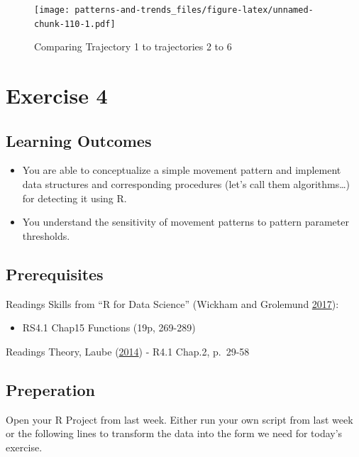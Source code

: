 \documentclass[]{book}
\providecommand{\tightlist}{%
  \setlength{\itemsep}{0pt}\setlength{\parskip}{0pt}}
\begin{document}
\begin{figure}
\centering
\texttt{[image: patterns-and-trends\_files/figure-latex/unnamed-chunk-110-1.pdf]}
\caption{\label{fig:unnamed-chunk-110}Comparing Trajectory 1 to trajectories 2 to 6}
\end{figure}

\hypertarget{exercise-4}{%
\chapter{Exercise 4}\label{exercise-4}}

\hypertarget{learning-outcomes-2}{%
\section{Learning Outcomes}\label{learning-outcomes-2}}

\begin{itemize}
\tightlist
\item
  You are able to conceptualize a simple movement pattern and implement data structures and corresponding procedures (let's call them algorithms\ldots{}) for detecting it using R.
\item
  You understand the sensitivity of movement patterns to pattern parameter thresholds.
\end{itemize}

\hypertarget{prerequisites-3}{%
\section{Prerequisites}\label{prerequisites-3}}

Readings Skills from ``R for Data Science'' (Wickham and Grolemund \protect\hyperlink{ref-wickham2017}{2017}):

\begin{itemize}
\tightlist
\item
  RS4.1 Chap15 Functions (19p, 269-289)
\end{itemize}

Readings Theory, Laube (\protect\hyperlink{ref-laube2014}{2014})
- R4.1 Chap.2, p.~29-58

\hypertarget{preperation-3}{%
\section{Preperation}\label{preperation-3}}

Open your R Project from last week. Either run your own script from last week or the following lines to transform the data into the form we need for today's exercise.
\end{document}
